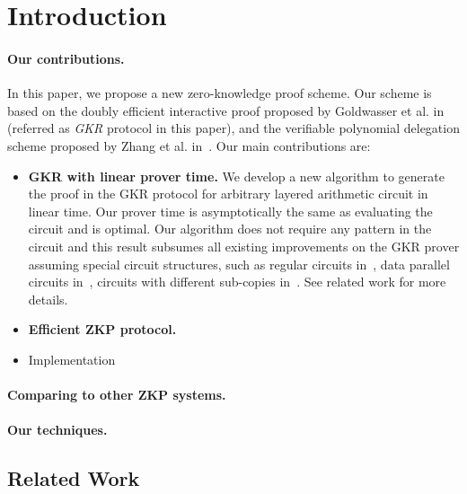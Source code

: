 \section{Introduction}\label{sec:intro}

\paragraph{Our contributions.} In this paper, we propose a new zero-knowledge proof scheme. Our scheme is based on the doubly efficient interactive proof proposed by Goldwasser et al. in~\cite{GKR} (referred as \emph{GKR} protocol in this paper), and the verifiable polynomial delegation scheme proposed by Zhang et al. in~\cite{zhang2017vsql}. Our main contributions are:
\begin{itemize}
	\item \textbf{GKR with linear prover time.} We develop a new algorithm to generate the proof in the GKR protocol for arbitrary layered arithmetic circuit in linear time. Our prover time is asymptotically the same as evaluating the circuit and is optimal. Our algorithm does not require any pattern in the circuit and this result subsumes all existing improvements on the GKR prover assuming special circuit structures, such as regular circuits in~\cite{t13}, data parallel circuits in~\cite{t13,wahby2017full}, circuits with different sub-copies in~\cite{vram}. See related work for more details. 
	\item \textbf{Efficient ZKP protocol.}
	\item Implementation
\end{itemize}

\paragraph{Comparing to other ZKP systems.}

\paragraph{Our techniques.}


\subsection{Related Work}

